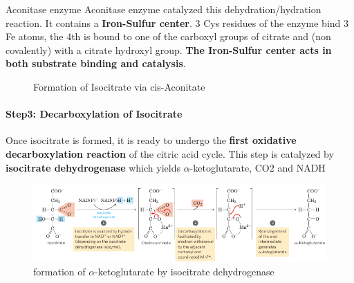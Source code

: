 \documentclass[../main.tex]{subfiles}
\begin{document}
\begin{RemarkWithTitel}{Aconitase enzyme}
	Aconitase enzyme catalyzed this dehydration/hydration reaction. It contains a \textbf{Iron-Sulfur center}. 3 Cys residues of the enzyme bind 3 Fe atoms, the 4th is bound to one of the carboxyl groups of citrate and (non covalently) with a citrate hydroxyl group. \textbf{The Iron-Sulfur center acts in both substrate binding and catalysis}. 
\end{RemarkWithTitel}

\begin{figure}[H]
	\centering
	\caption{Formation of Isocitrate via cis-Aconitate}
\end{figure}

\paragraph{Step3: Decarboxylation of Isocitrate}
Once isocitrate is formed, it is ready to undergo the \textbf{first oxidative decarboxylation reaction} of the citric acid cycle. This step is catalyzed by \textbf{isocitrate dehydrogenase} which yields $\alpha$-ketoglutarate, CO2 and NADH

\begin{figure}[H]
	\centering
	\includegraphics[width = \textwidth]{TCAS3}
	\caption{formation of $\alpha$-ketoglutarate by isocitrate dehydrogenase}
\end{figure}
\end{document}
